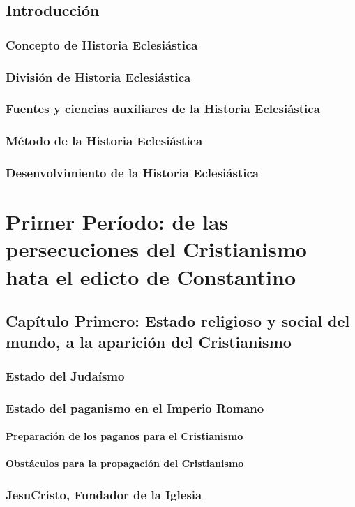 \raggedbottom{} \documentclass[12pt]{book}
\begin{document}
\chapter{Introducción}
\section{Concepto de Historia Eclesiástica}
\section{División de Historia Eclesiástica}
\section{Fuentes y ciencias auxiliares de la Historia Eclesiástica}
\section{Método de la Historia Eclesiástica}
\section{Desenvolvimiento de la Historia Eclesiástica}
\part{Primer Período: de las persecuciones del Cristianismo hata el edicto de Constantino}
\chapter{Capítulo Primero: Estado religioso y social del mundo, a la aparición del Cristianismo}
\section{Estado del Judaísmo}
\section{Estado del paganismo en el Imperio Romano}
\subsection{Preparación de los paganos para el Cristianismo}
\subsection{Obstáculos para la propagación del Cristianismo}
\section{JesuCristo, Fundador de la Iglesia}
\end{document}
